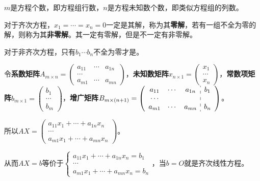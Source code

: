 $m$是方程个数，即方程组行数，$n$是方程未知数个数，即类似方程组的列数。

对于齐次方程，$x_1=\cdots=x_n=0$一定是其解，称为其\textbf{零解}，若有一组不全为零的解，则称为其\textbf{非零解}。其一定有零解，但是不一定有非零解。

对于非齐次方程，只有$b_1\cdots b_n$不全为零才是。\medskip

令\textbf{系数矩阵}$A_{m\times n}=\left(
    \begin{array}{ccc}
        a_{11} & \cdots & a_{1n} \\
        \cdots \\
        a_{m1} & \cdots & a_{mn}
    \end{array}
\right)$，\textbf{未知数矩阵}$x_{n\times 1}=\left(
    \begin{array}{c}
        x_1 \\
        \cdots \\
        x_n
    \end{array}
\right)$，\textbf{常数项矩阵}$b_{m\times 1}=\left(
    \begin{array}{c}
        b_1 \\
        \cdots \\
        b_m
    \end{array}
\right)$，\textbf{增广矩阵}$B_{m\times(n+1)}=\left(
    \begin{array}{c:c}
        \begin{matrix}
            a_{11} & \cdots & a_{1n}\\
            \cdots \\
            a_{m1} & \cdots & a_{mn}
        \end{matrix}&
        \begin{matrix}
            b_1\\
            \\
            b_n
        \end{matrix}
    \end{array}
\right)$。

所以$AX=\left(
    \begin{array}{c}
        a_11x_1+\cdots+a_{1n}x_n \\
        \cdots \\
        a_{m1}x_1+\cdots+a_{mn}x_n
    \end{array}
\right)$。

从而$AX=b$等价于$\begin{cases}
    a_{11}x_1+\cdots+a_{1n}x_n=b_1 \\
    \cdots \\
    a_{m1}x_1+\cdots+a_{mn}x_n=b_n
\end{cases}$，当$b=O$就是齐次线性方程。

